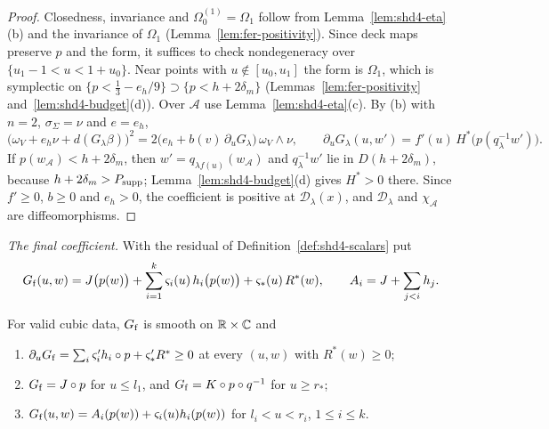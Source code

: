 \begin{proof}
Closedness, invariance and $\Omega^{(1)}_0=\Omega_1$ follow from Lemma~\ref{lem:shd4-eta}(b) and the invariance of
$\Omega_1$ (Lemma~\ref{lem:fer-positivity}). Since deck maps preserve $p$ and the form, it suffices to check
nondegeneracy over $\{u_1-1<u<1+u_0\}$. Near points with $u\notin[u_0,u_1]$ the form is $\Omega_1$, which is symplectic
on $\{p<\frac13-e_h/9\}\supset\{p<h+2\delta_m\}$ (Lemmas~\ref{lem:fer-positivity} and~\ref{lem:shd4-budget}(d)). Over
$\mathcal A$ use Lemma~\ref{lem:shd4-eta}(c). By (b) with $n=2$, $\sigma_\Sigma=\nu$ and $e=e_h$,
\[
 \bigl(\omega_V+e_h\nu+d(G_\lambda\beta)\bigr)^2=2\bigl(e_h+b(v)\,\partial_uG_\lambda\bigr)\,\omega_V\wedge\nu,\qquad
 \partial_uG_\lambda(u,w')=f'(u)\,H^*\bigl(p(q_\lambda^{-1}w')\bigr).
\]
If $p(w_{\mathcal A})<h+2\delta_m$, then $w'=q_{\lambda f(u)}(w_{\mathcal A})$ and $q_\lambda^{-1}w'$ lie in $D(h+2\delta_m)$, because
$h+2\delta_m>P_{\rm supp}$; Lemma~\ref{lem:shd4-budget}(d) gives $H^*>0$ there. Since $f'\ge0$, $b\ge0$ and $e_h>0$, the
coefficient is positive at $\mathcal D_\lambda(x)$, and $\mathcal D_\lambda$ and $\chi_{\mathcal A}$ are diffeomorphisms.
\end{proof}

\emph{The final coefficient.} With the residual of Definition~\ref{def:shd4-scalars} put
\[
 G_{\rm f}(u,w)=J\bigl(p(w)\bigr)+\sum_{i=1}^k\varsigma_i(u)\,h_i\bigl(p(w)\bigr)+\varsigma_*(u)\,R^*(w),\qquad
 A_i=J+\sum_{j<i}h_j .
\]

\begin{lemma}\label{lem:shd4-Gf}
For valid cubic data, $G_{\rm f}$ is smooth on $\mathbb{R}\times\mathbb{C}$ and
\begin{enumerate}[label=(\alph*)]
\item $\partial_uG_{\rm f}=\sum_i\varsigma_i'h_i\circ p+\varsigma_*'R^*\ge0$ at every $(u,w)$ with $R^*(w)\ge0$;
\item $G_{\rm f}=J\circ p$ for $u\le l_1$, and $G_{\rm f}=K\circ p\circ q^{-1}$ for $u\ge r_*$;
\item $G_{\rm f}(u,w)=A_i(p(w))+\varsigma_i(u)h_i(p(w))$ for $l_i<u<r_i$, $1\le i\le k$.
\end{enumerate}
\end{lemma}

